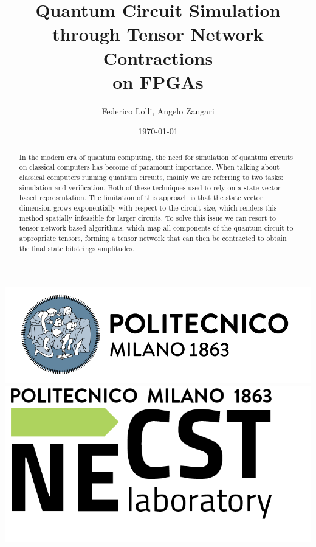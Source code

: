 \documentclass[12pt,oneside,a4paper]{article}
\title{\textbf{Quantum Circuit Simulation through Tensor Network Contractions \\ on FPGAs}}
\author{Federico Lolli, Angelo Zangari}
\date{\today}
\begin{document}
\begin{titlepage}
    \centering
    \clearpage
    \maketitle
	\thispagestyle{empty}
	\vspace*{1cm}
	\vfill
	\centering
	\includegraphics{logo_polimi.png}\includegraphics{logo_NECST.png}
\end{titlepage}

\begin{abstract}
In the modern era of quantum computing, the need for simulation of quantum circuits on classical computers has become of paramount importance. When talking about classical computers running quantum circuits, mainly we are referring to two tasks: simulation and verification. Both of these techniques used to rely on a state vector based representation. The limitation of this approach is that the state vector dimension grows exponentially with respect to the circuit size, which renders this method spatially infeasible for larger circuits. To solve this issue we can resort to tensor network based algorithms, which map all components of the quantum circuit to appropriate tensors, forming a tensor network that can then be contracted to obtain the final state bitstrings amplitudes.

\end{abstract}
\end{document}

